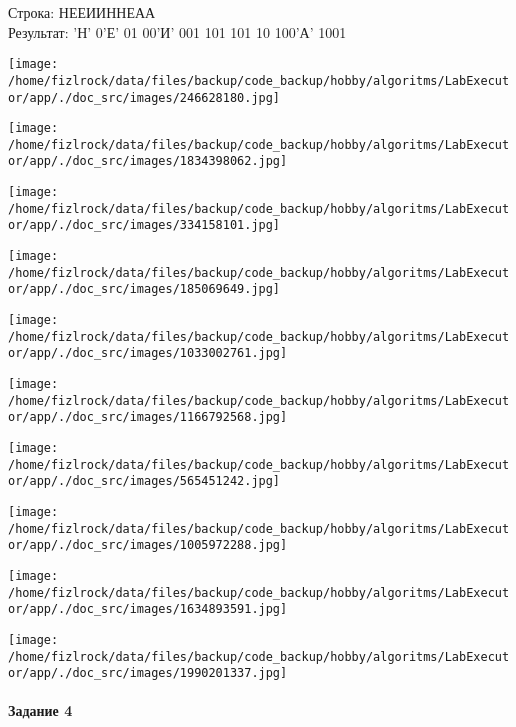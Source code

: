 \documentclass[a4paper, 12pt]{article}
\begin{document}
Строка: 
НЕЕИИННЕАА\\
Результат: 'Н' 0'Е' 01 00'И' 001 101 101 10 100'А' 1001

\texttt{[image: /home/fizlrock/data/files/backup/code\_backup/hobby/algoritms/LabExecutor/app/./doc\_src/images/246628180.jpg]}

\texttt{[image: /home/fizlrock/data/files/backup/code\_backup/hobby/algoritms/LabExecutor/app/./doc\_src/images/1834398062.jpg]}

\texttt{[image: /home/fizlrock/data/files/backup/code\_backup/hobby/algoritms/LabExecutor/app/./doc\_src/images/334158101.jpg]}

\texttt{[image: /home/fizlrock/data/files/backup/code\_backup/hobby/algoritms/LabExecutor/app/./doc\_src/images/185069649.jpg]}

\texttt{[image: /home/fizlrock/data/files/backup/code\_backup/hobby/algoritms/LabExecutor/app/./doc\_src/images/1033002761.jpg]}

\texttt{[image: /home/fizlrock/data/files/backup/code\_backup/hobby/algoritms/LabExecutor/app/./doc\_src/images/1166792568.jpg]}

\texttt{[image: /home/fizlrock/data/files/backup/code\_backup/hobby/algoritms/LabExecutor/app/./doc\_src/images/565451242.jpg]}

\texttt{[image: /home/fizlrock/data/files/backup/code\_backup/hobby/algoritms/LabExecutor/app/./doc\_src/images/1005972288.jpg]}

\texttt{[image: /home/fizlrock/data/files/backup/code\_backup/hobby/algoritms/LabExecutor/app/./doc\_src/images/1634893591.jpg]}

\texttt{[image: /home/fizlrock/data/files/backup/code\_backup/hobby/algoritms/LabExecutor/app/./doc\_src/images/1990201337.jpg]}
\pagebreak
\paragraph{Задание 4}
\end{document}
